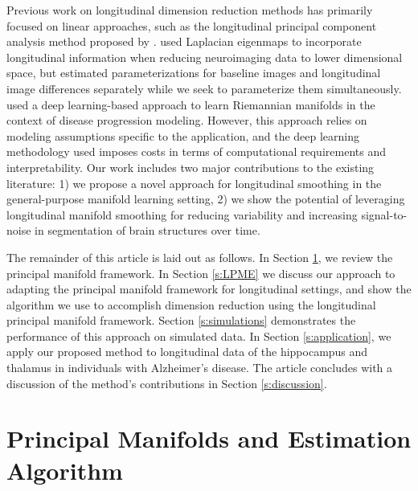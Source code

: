 \documentclass[11pt,reqno]{article}
\theoremstyle{definition}
\begin{document}
Previous work on longitudinal dimension reduction methods has primarily focused on linear approaches, such as the longitudinal principal component analysis method proposed by \cite{kinsonLongitudinalPrincipalComponent2020}. \cite{wolzManifoldLearningBiomarker2010a} used Laplacian eigenmaps to incorporate longitudinal information when reducing neuroimaging data to lower dimensional space, but estimated parameterizations for baseline images and longitudinal image differences separately while we seek to parameterize them simultaneously. \cite{louisRiemannianGeometryLearning2019} used a deep learning-based approach to learn Riemannian manifolds in the context of disease progression modeling. However, this approach relies on modeling assumptions specific to the application, and the deep learning methodology used imposes costs in terms of computational requirements and interpretability. Our work includes two major contributions to the existing literature: 1) we propose a novel approach for longitudinal smoothing in the general-purpose manifold learning setting, 2) we show the potential of leveraging longitudinal manifold smoothing for reducing variability and increasing signal-to-noise in segmentation of brain structures over time.

The remainder of this article is laid out as follows. In Section \ref{s:PME}, we review the principal manifold framework. In Section \ref{s:LPME} we discuss our approach to adapting the principal manifold framework for longitudinal settings, and show the algorithm we use to accomplish dimension reduction using the longitudinal principal manifold framework. Section \ref{s:simulations} demonstrates the performance of this approach on simulated data. In Section \ref{s:application}, we apply our proposed method to longitudinal data of the hippocampus and thalamus in individuals with Alzheimer's disease. The article concludes with a discussion of the method's contributions in Section \ref{s:discussion}.








\section{Principal Manifolds and Estimation Algorithm}\label{s:PME}
\end{document}
